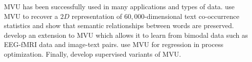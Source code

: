 \documentclass{article} %
\begin{document}
    
    




MVU has been successfully used in many applications and types of data. \citet{mvu-intro} use MVU to recover a $2D$ representation of $60,000$-dimensional text co-occurrence statistics and show that semantic relationships between words are preserved. \citet{mcu-bimodal} develop an extension to MVU which allows it to learn from bimodal data such as EEG-fMRI data and image-text pairs. \citet{mcu-regression} use MVU for regression in process optimization. Finally, \citet{colored-mvu,smvu-process,smvu} develop supervised variants of MVU.
\end{document}
